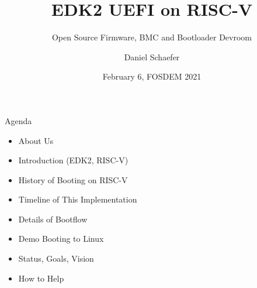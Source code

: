 \documentclass[
  10pt
]{beamer}
\title{EDK2 UEFI on RISC-V}
\subtitle{Open Source Firmware, BMC and Bootloader Devroom}
\date{February 6, FOSDEM 2021}
\author{Daniel Schaefer}
\begin{document}
\maketitle

\begin{frame}{Agenda}
  \begin{itemize}
    \item About Us
    \item Introduction (EDK2, RISC-V)
    \item History of Booting on RISC-V
    \item Timeline of This Implementation
    \item Details of Bootflow
    \item Demo Booting to Linux
    \item Status, Goals, Vision
    \item How to Help
  \end{itemize}
\end{frame}
\end{document}
